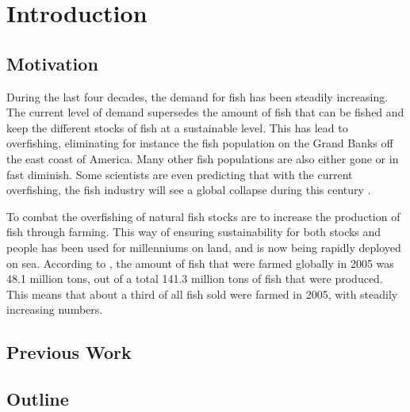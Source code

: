 
\chapter{Introduction}


\section{Motivation}
During the last four decades, the demand for fish 
has been steadily increasing. The current level 
of demand supersedes the amount of fish that 
can be fished and keep the different stocks of 
fish at a sustainable level. This has lead to 
overfishing, eliminating for instance the 
fish population on the Grand Banks off the east 
coast of America. Many other fish 
populations are also either gone or in fast 
diminish. Some scientists are even predicting 
that with the current overfishing, the fish industry will 
see a global collapse during this century \citet{worm06}.

To combat the overfishing of natural fish stocks are to increase 
the production of fish through farming. This way of ensuring 
sustainability for both stocks and people has been 
used for millenniums on land, and is now being rapidly 
deployed on sea. According to \citet{fao06}, the amount of 
fish that were farmed globally in 2005 was 48.1 million tons, out of 
a total 141.3 million tons of fish that were produced. This 
means that about a third of all fish sold were farmed in 2005, with 
steadily increasing numbers.

\section{Previous Work}


\section{Outline}

